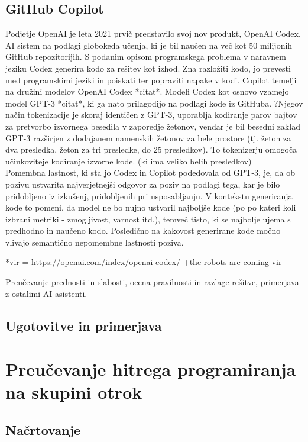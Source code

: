 \documentclass[12pt,a4paper]{book}
\begin{document}
\section{GitHub Copilot}
Podjetje OpenAI je leta 2021 prvič predstavilo svoj nov produkt, OpenAI Codex, AI sistem na podlagi globokeda učenja, ki je bil naučen na več kot 50 milijonih GitHub repozitorijih. S podanim opisom programskega problema v naravnem jeziku Codex generira kodo za rešitev kot izhod. Zna razložiti kodo, jo prevesti med programskimi jeziki in poiskati ter popraviti napake v kodi.
Copilot temelji na družini modelov OpenAI Codex *citat*. Modeli Codex kot osnovo vzamejo model GPT-3 *citat*, ki ga nato prilagodijo na podlagi kode iz GitHuba. ?Njegov način tokenizacije je skoraj identičen z GPT-3, uporablja kodiranje parov bajtov za pretvorbo izvornega besedila v zaporedje žetonov, vendar je bil besedni zaklad GPT-3 razširjen z dodajanem namenskih žetonov za bele prostore (tj. žeton za dva presledka, žeton za
tri presledke, do 25 presledkov). To tokenizerju omogoča učinkoviteje
kodiranje izvorne kode. (ki ima veliko belih presledkov) \\
Pomembna lastnost, ki sta jo Codex in Copilot podedovala od
GPT-3, je, da ob pozivu ustvarita najverjetnejši odgovor
za poziv na podlagi tega, kar je bilo pridobljeno
iz izkušenj, pridobljenih pri usposabljanju. V kontekstu generiranja kode to pomeni,
da model ne bo nujno ustvaril najboljše kode (po
po kateri koli izbrani metriki - zmogljivost, varnost itd.),
temveč tisto, ki se najbolje ujema s predhodno in naučeno kodo.
Posledično na kakovost generirane kode močno vlivajo semantično nepomembne lastnosti poziva. \cite{9833571}

*vir = https://openai.com/index/openai-codex/
\cite{10.1145/3520312.3534862}
+the robots are coming vir


Preučevanje prednosti in slabosti, ocena pravilnosti in razlage rešitve, primerjava z ostalimi  AI asistenti.

\section{Ugotovitve in primerjava}

\chapter{Preučevanje hitrega programiranja na skupini otrok}
\section{Načrtovanje}
\end{document}
